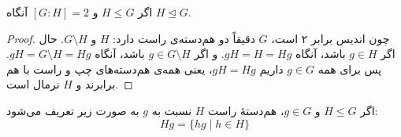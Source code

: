 \begin{theorem}
    اگر \( H \leq G \) و \( [G : H] = 2 \) آنگاه \( H \trianglelefteq G \).
\end{theorem}

\begin{proof}
    چون اندیس برابر ۲ است، \( G \) دقیقاً دو هم‌دسته‌ی راست دارد: \( H \) و \( G \setminus H \).  
    حال اگر \( g \in H \) باشد، آنگاه \( gH = H = Hg \).  
    و اگر \( g \in G \setminus H \) باشد، آنگاه \( gH = G \setminus H = Hg \).  
    پس برای همه \( g \in G \) داریم \( gH = Hg \)، یعنی همه‌ی هم‌دسته‌های چپ و راست با هم برابرند و \( H \) نرمال است.
\end{proof}

\begin{definition}
    اگر \( H \leq G \) و \( g \in G \)، هم‌دستهٔ راست \( H \) نسبت به \( g \) به صورت زیر تعریف می‌شود:
    \[
        Hg = \{ hg \mid h \in H \}
    \]
\end{definition}
